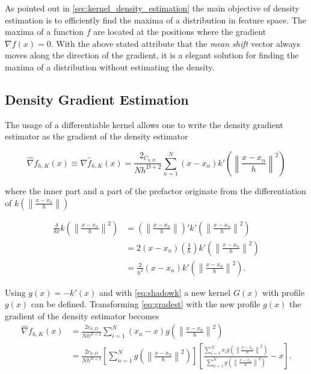 As pointed out in \autoref{sec:kernel_density_estimation} the main
objective of density estimation is to efficiently find the maxima of a
distribution in feature space. The maxima of a function $f$ are
located at the positions where the gradient $\nabla f(x) = 0$. With
the above stated attribute that the \emph{mean shift} vector always
moves along the direction of the gradient, it is a elegant solution
for finding the maxima of a distribution without estimating the
density.

\subsection{Density Gradient Estimation} %
\label{sub:gradient_estimation}
The usage of a differentiable kernel allows one to write the density
gradient estimator as the gradient of the density estimator

\begin{equation}\label{eq:gradest}
  \hat{\nabla} f_{h,K}(x) \equiv \nabla \hat{f}_{h,K}(x) = 
  \frac{2_{C_{k,D}}}{Nh^{D+2}}%
  \sum_{n = 1}^N (x - x_n)k' 
  \left( \left\lVert \frac{x - x_n}{h} \right\rVert^2 \right)
\end{equation}

where the inner part and a part of the prefactor originate from the
differentiation of $k\left( \left\lVert \frac{x - x_n}{h} \right\rVert
\right)$

\begin{equation}\label{eq:kerndiff}
  \begin{split}
    \frac{\delta}{\delta x} k\left( \left\lVert \frac{x - x_n}{h}
      \right\rVert^2 \right) & = \left( \left\lVert \frac{x - x_n}{h}
      \right\rVert \right)' k'\left( \left\lVert \frac{x - x_n}{h}
      \right\rVert^2 \right) \\ & = 2 \left( x - x_n \right) \left(
      \frac{1}{h} \right) k'\left( \left\lVert \frac{x - x_n}{h}
      \right\rVert^2 \right) \\ & = \frac{2}{h^2}(x - x_n) k'\left(
      \left\lVert \frac{x - x_n}{h} \right\rVert^2 \right).
  \end{split}
\end{equation}

Using $g(x) = -k'(x)$ and with \autoref{eq:shadowk} a new kernel
$G(x)$ with profile $g(x)$ can be defined. Transforming
\autoref{eq:gradest} with the new profile $g(x)$ the gradient of the
density estimator becomes
\begin{subequations}
  \begin{align}
    \hat{\nabla} f_{h,K}(x) & = \frac{2c_{k,D}}{Nh^{D+2}}\sum_{i=1}^N
    \left(x_n - x\right)g\left(\left\lVert \frac{x - x_n}{h}
      \right\rVert^2\right) \label{eq:gradest1}\\ & =
    \frac{2c_{k,D}}{Nh^{D+2}} \left[ \sum_{n=1}^N g\left(\left\lVert
          \frac{x - x_n}{h} \right\rVert^2\right) \right] \left[
      \frac{\sum_{i=1}^N x_i g\left(\left\lVert \frac{x - x_n}{h}
          \right\rVert^2\right)}{\sum_{n=1}^N g\left(\left\lVert
            \frac{x - x_n}{h} \right\rVert^2\right)} - x \right].
    \label{eq:gradest2}
  \end{align}
\end{subequations}

